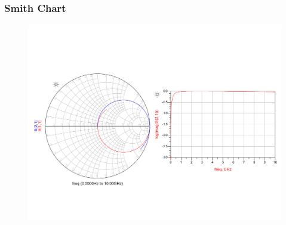 \documentclass[11pt]{article}
\begin{document}
\subsubsection{Smith Chart}
\begin{figure}[H]
	\centering \includegraphics[width=\textwidth]{images/cap_smith.png}
\end{figure}
\end{document}
